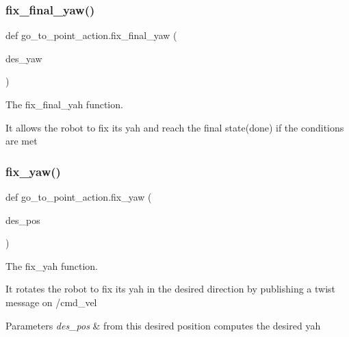 \subsubsection{\texorpdfstring{fix\+\_\+final\+\_\+yaw()}{fix\_final\_yaw()}}
{\footnotesize\ttfamily def go\+\_\+to\+\_\+point\+\_\+action.\+fix\+\_\+final\+\_\+yaw (\begin{DoxyParamCaption}\item[{}]{des\+\_\+yaw }\end{DoxyParamCaption})}



The fix\+\_\+final\+\_\+yah function. 

It allows the robot to fix it\textquotesingle{}s yah and reach the final state(done) if the conditions are met \mbox{\label{namespacego__to__point__action_a18e7fef09d30f59bb91061f4b91f87e6}} 
\subsubsection{\texorpdfstring{fix\+\_\+yaw()}{fix\_yaw()}}
{\footnotesize\ttfamily def go\+\_\+to\+\_\+point\+\_\+action.\+fix\+\_\+yaw (\begin{DoxyParamCaption}\item[{}]{des\+\_\+pos }\end{DoxyParamCaption})}



The fix\+\_\+yah function. 

It rotates the robot to fix it\textquotesingle{}s yah in the desired direction by publishing a twist message on /cmd\+\_\+vel 
\begin{DoxyParams}{Parameters}
{\em des\+\_\+pos} & from this desired position computes the desired yah \\
\hline
\end{DoxyParams}
\mbox{\label{namespacego__to__point__action_a7c35034eab524fbff7d05d80fd65ede4}} 
